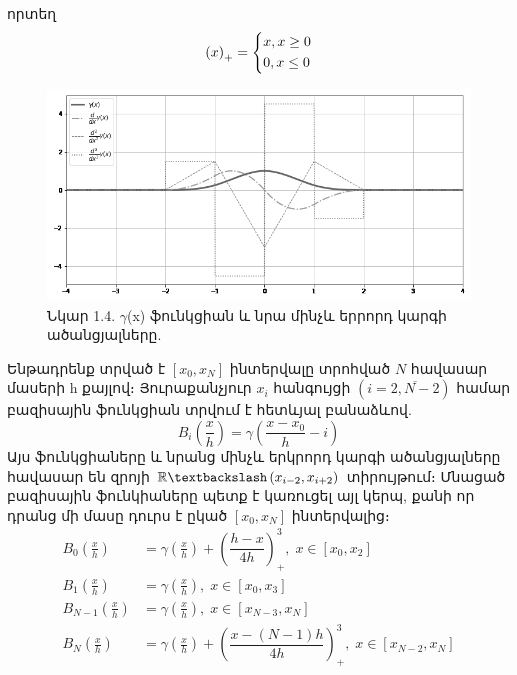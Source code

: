 \documentclass[fleqn, bachelor,subf,12pt,notitlepage]{article}
\begin{document}
որտեղ
\begin{equation}
\left(x\right)_{+}=
\begin{dcases}
			x, x \ge 0 \\
			0, x \leq 0		
\end{dcases}
\end{equation}
\begin{figure}[h!]
\centering
\includegraphics[width=1.0\textwidth]{images/cubic_compact_support_basis}
\captionsetup{labelformat=empty}
\caption{\hfill Նկար 1.4. $\gamma$(x) ֆունկցիան և նրա մինչև երրորդ կարգի ածանցյալները.}
\end{figure}
Ենթադրենք տրված է $\left[x_{0}, x_{N}\right]$ ինտերվալը տրոհված $N$ հավասար մասերի h քայլով։ Յուրաքանչյուր $x_{i}$ հանգույցի $(i=\overline{2, N-2})$ համար բազիսային ֆունկցիան տրվում է հետևյալ բանաձևով.
\begin{equation}
B_{i}\left(\dfrac{x}{h}\right)=\gamma \left(\frac{x-x_{0}}{h}-i\right)
\end{equation}
Այս ֆունկցիաները և նրանց մինչև երկրորդ կարգի ածանցյալները հավասար են զրոյի $\mathbb{R} \textbackslash \left(x_{i-2}, x_{i+2}\right)$ տիրույթում։
Մնացած բազիսային ֆունկիաները պետք է կառուցել այլ կերպ, քանի որ դրանց մի մասը դուրս է ըկած  $\left[x_{0}, x_{N}\right]$ ինտերվալից։
\begin{equation}
\begin{aligned}
B_{0}\left(\frac{x}{h}\right) &= \gamma \left(\frac{x}{h}\right) + \left(\dfrac{h - x}{4h}\right)^{3}_{+} , \; x \in \left[x_{0}, x_{2}\right] \\
B_{1}\left(\frac{x}{h}\right) &= \gamma \left(\frac{x}{h}\right), \; x \in \left[x_{0}, x_{3}\right]\\
B_{N-1}\left(\frac{x}{h}\right) &= \gamma \left(\frac{x}{h}\right), \; x \in \left[x_{N-3}, x_{N}\right] \\
B_{N}\left(\frac{x}{h}\right) &= \gamma \left(\frac{x}{h}\right) + \left(\dfrac{x - (N-1)h}{4h}\right)^{3}_{+} , \; x \in \left[x_{N-2}, x_{N}\right]
\end{aligned}
\end{equation}
\end{document}
